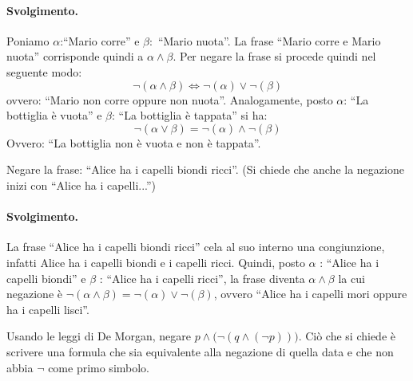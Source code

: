 \paragraph*{Svolgimento.} Poniamo $\alpha$:``Mario corre'' e $\beta:$ ``Mario nuota''. La frase ``Mario corre e Mario nuota'' corrisponde quindi a $\alpha \land \beta$. Per negare la frase si procede quindi nel seguente modo:
\begin{displaymath}
	\neg (\alpha \land \beta)  \iff \neg (\alpha) \lor \neg (\beta)
\end{displaymath}
ovvero: ``Mario non corre oppure non nuota''. Analogamente, posto $\alpha$: ``La bottiglia è vuota'' e $\beta$: ``La bottiglia è tappata'' si ha:
\begin{displaymath}
	\neg (\alpha \lor \beta) = \neg (\alpha) \land \neg (\beta)
\end{displaymath}
Ovvero: ``La bottiglia non è vuota e non è tappata''. \hfill \blacksquare
\begin{exsbox}
	Negare la frase: ``Alice ha i capelli biondi ricci''. (Si chiede che anche la negazione inizi con ``Alice ha i capelli...'')
\end{exsbox}
\paragraph*{Svolgimento.} La frase ``Alice ha i capelli biondi ricci'' cela al suo interno una congiunzione, infatti Alice ha i capelli biondi e i capelli ricci. Quindi, posto $\alpha$ : ``Alice ha i capelli biondi'' e $\beta$ : ``Alice ha i capelli ricci'', la frase diventa $\alpha \land \beta$ la cui negazione è $\neg (\alpha \land \beta) = \neg(\alpha) \lor \neg(\beta)$, ovvero ``Alice ha i capelli mori oppure ha i capelli lisci''. \hfill \blacksquare

\begin{exsbox}
	Usando le leggi di De Morgan, negare $p \land \bigl( \neg (q \land (\neg p)) \bigr)$. Ciò che si chiede è scrivere una formula che sia equivalente alla negazione di quella data e che non abbia $\neg$ come primo simbolo.
\end{exsbox}
